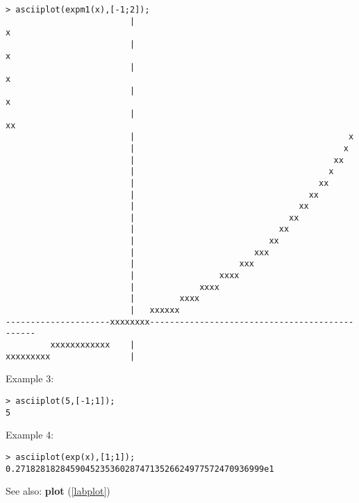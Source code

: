 \begin{center}\begin{minipage}{15cm}\begin{Verbatim}[frame=single]
> asciiplot(expm1(x),[-1;2]);
                         |                                                 x
                         |                                                x 
                         |                                               x  
                         |                                              x   
                         |                                            xx    
                         |                                           x      
                         |                                          x       
                         |                                        xx        
                         |                                       x          
                         |                                     xx           
                         |                                   xx             
                         |                                 xx               
                         |                               xx                 
                         |                             xx                   
                         |                           xx                     
                         |                        xxx                       
                         |                     xxx                          
                         |                 xxxx                             
                         |             xxxx                                 
                         |         xxxx                                     
                         |   xxxxxx                                         
---------------------xxxxxxxx-----------------------------------------------
         xxxxxxxxxxxx    |                                                  
xxxxxxxxx                |                                                  
\end{Verbatim}
\end{minipage}\end{center}
\noindent Example 3: 
\begin{center}\begin{minipage}{15cm}\begin{Verbatim}[frame=single]
> asciiplot(5,[-1;1]);
5
\end{Verbatim}
\end{minipage}\end{center}
\noindent Example 4: 
\begin{center}\begin{minipage}{15cm}\begin{Verbatim}[frame=single]
> asciiplot(exp(x),[1;1]);
0.27182818284590452353602874713526624977572470936999e1
\end{Verbatim}
\end{minipage}\end{center}
See also: \textbf{plot} (\ref{labplot})
